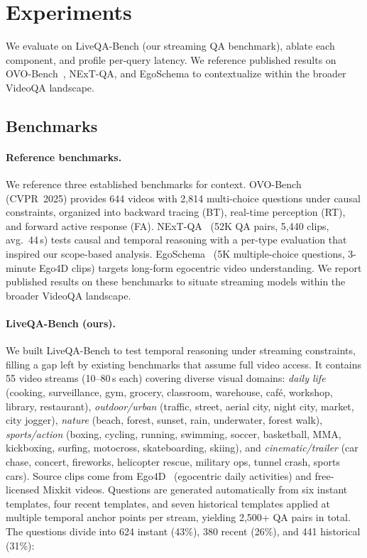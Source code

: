\section{Experiments}
\label{sec:experiments}

We evaluate \ours on LiveQA-Bench (our streaming QA benchmark), ablate each component, and profile per-query latency. We reference published results on OVO-Bench~\cite{li2025ovobench}, NExT-QA, and EgoSchema to contextualize \ours within the broader VideoQA landscape.

\subsection{Benchmarks}
\label{sec:benchmarks}

\paragraph{Reference benchmarks.}
We reference three established benchmarks for context.
OVO-Bench~\cite{li2025ovobench} (CVPR~2025) provides 644 videos with 2{,}814 multi-choice questions under causal constraints, organized into backward tracing (BT), real-time perception (RT), and forward active response (FA).
NExT-QA~\cite{xiao2021nextqa} (52K QA pairs, 5{,}440 clips, avg.\ 44\,s) tests causal and temporal reasoning with a per-type evaluation that inspired our scope-based analysis.
EgoSchema~\cite{mangalam2023egoschema} (5K multiple-choice questions, 3-minute Ego4D clips) targets long-form egocentric video understanding.
We report published results on these benchmarks to situate streaming models within the broader VideoQA landscape.

\paragraph{LiveQA-Bench (ours).}
We built LiveQA-Bench to test temporal reasoning under streaming constraints, filling a gap left by existing benchmarks that assume full video access.
It contains 55 video streams (10--80\,s each) covering diverse visual domains:
\emph{daily life} (cooking, surveillance, gym, grocery, classroom, warehouse, caf\'{e}, workshop, library, restaurant),
\emph{outdoor/urban} (traffic, street, aerial city, night city, market, city jogger),
\emph{nature} (beach, forest, sunset, rain, underwater, forest walk),
\emph{sports/action} (boxing, cycling, running, swimming, soccer, basketball, MMA, kickboxing, surfing, motocross, skateboarding, skiing),
and \emph{cinematic/trailer} (car chase, concert, fireworks, helicopter rescue, military ops, tunnel crash, sports cars).
Source clips come from Ego4D~\cite{grauman2022ego4d} (egocentric daily activities) and free-licensed Mixkit videos.
Questions are generated automatically from six instant templates, four recent templates, and seven historical templates applied at multiple temporal anchor points per stream, yielding 2{,}500+ QA pairs in total.
The questions divide into 624 instant (43\%), 380 recent (26\%), and 441 historical (31\%):


